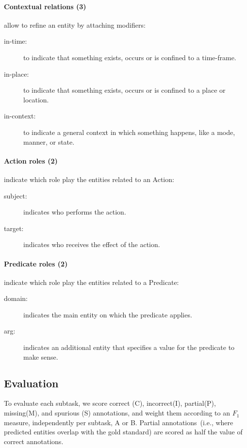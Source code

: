 \documentclass[a4paper,11pt,twocolumn,twoside]{article}
\begin{document}
\paragraph{Contextual relations (3)} allow to refine an entity by attaching modifiers:

\begin{description}
  \item[in-time:] to indicate that something exists, occurs or is confined to a time-frame.
  \item[in-place:] to indicate that something exists, occurs or is confined to a place or location.
  \item[in-context:] to indicate a general context in which something happens, like a mode, manner, or state.
\end{description}

\paragraph{Action roles (2)} indicate which role play the entities related to an Action:

\begin{description}
  \item[subject:] indicates who performs the action.
  \item[target:] indicates who receives the effect of the action.
\end{description}

\paragraph{Predicate roles (2)} indicate which role play the entities related to a Predicate:

\begin{description}
  \item[domain:] indicates the main entity on which the predicate applies.
  \item[arg:] indicates an additional entity that specifies a value for the predicate to make sense.
\end{description}

\subsection{Evaluation}

To evaluate each subtask, we score correct (C), incorrect(I), partial(P), missing(M), and spurious (S)
annotations, and weight them according to an $F_1$ measure, independently per subtask, A or B.
Partial annotations~(i.e., where predicted entities overlap with the gold standard) are scored as half the value of correct annotations.
\end{document}
